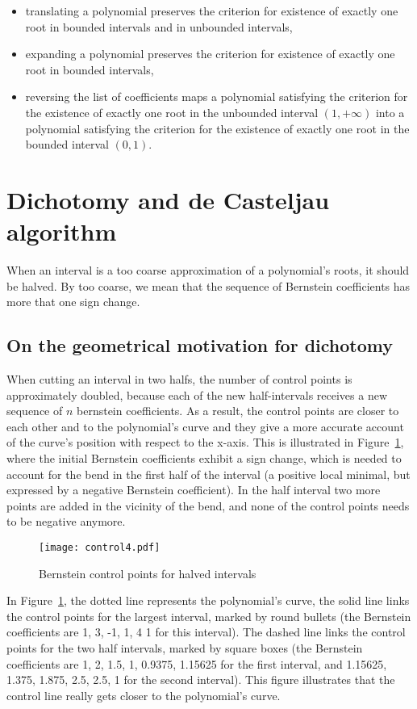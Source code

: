 \documentclass{mscs}
\begin{document}
\begin{itemize}
\item translating a polynomial preserves the criterion for existence
of exactly one root in bounded intervals and in unbounded intervals,
\item expanding a polynomial preserves the criterion for existence of
  exactly one root in bounded intervals,
\item reversing the list of coefficients maps a polynomial satisfying
  the criterion for the existence of exactly one root in the unbounded
  interval \((1,+\infty)\) into a polynomial satisfying the criterion
  for the existence of exactly one root in the bounded interval \((0,1)\).
\end{itemize}

\section{Dichotomy and de Casteljau algorithm}
\label{dichotomy}

When an interval is a too coarse approximation of a polynomial's
roots, it should be halved. By too coarse, we mean that the sequence
of Bernstein coefficients has more that one sign change.
\subsection{On the geometrical motivation for dichotomy}
When cutting an interval in two halfs, the number of control points is 
approximately doubled, because each of the new half-intervals receives a
new sequence of \(n\) bernstein coefficients.  As a result, the control points
are closer to each other and to the polynomial's curve and they give a more
accurate account of the curve's position with respect to the x-axis.  This is
illustrated in Figure~\ref{dichotomy-curve}, where the initial Bernstein
coefficients exhibit a sign change, which is needed to account for the bend
in the first half of the interval (a positive local minimal, but expressed
by a negative Bernstein coefficient).  In the half interval two more points
are added in the vicinity of the bend, and none of the control points needs
to be negative anymore.
\begin{figure}
\texttt{[image: control4.pdf]}
\caption{\label{dichotomy-curve}Bernstein control points for halved intervals}
\end{figure}

In Figure~\ref{dichotomy-curve}, the dotted line represents
the polynomial's curve, the solid line links the control points for
the largest interval, marked by round bullets (the Bernstein coefficients are
1, 3, -1, 1, 4 1 for this interval).  The dashed line links the control points
for the two half intervals, marked by square boxes
(the Bernstein coefficients are 1, 2, 1.5, 1,
0.9375, 1.15625 for the first interval, and 1.15625, 1.375, 1.875, 2.5, 2.5,
1 for the second interval).  This figure illustrates that the control line
really gets closer to the polynomial's curve.
\end{document}
